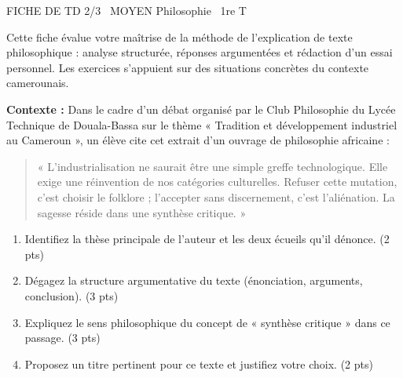 \documentclass[11pt]{article}
\begin{document}
\begin{tcolorbox}[enhanced,colback=popink,colframe=popink,arc=10pt,boxrule=0pt,left=12pt,right=12pt,top=9pt,bottom=9pt]
{\color{white}\popxbold\small FICHE DE TD 2/3 \textbullet\ MOYEN \hfill Philosophie \textbullet\ 1re T\par}
\end{tcolorbox}
\vspace{4pt}
\noindent Cette fiche évalue votre maîtrise de la méthode de l'explication de texte philosophique : analyse structurée, réponses argumentées et rédaction d'un essai personnel. Les exercices s'appuient sur des situations concrètes du contexte camerounais.

\begin{exercice}
\textbf{Contexte :} Dans le cadre d'un débat organisé par le Club Philosophie du Lycée Technique de Douala-Bassa sur le thème « Tradition et développement industriel au Cameroun », un élève cite cet extrait d'un ouvrage de philosophie africaine : 
\begin{quote}
« L'industrialisation ne saurait être une simple greffe technologique. Elle exige une réinvention de nos catégories culturelles. Refuser cette mutation, c'est choisir le folklore ; l'accepter sans discernement, c'est l'aliénation. La sagesse réside dans une synthèse critique. »
\end{quote}
\begin{enumerate}
    \item Identifiez la thèse principale de l'auteur et les deux écueils qu'il dénonce. (2 pts)
    \item Dégagez la structure argumentative du texte (énonciation, arguments, conclusion). (3 pts)
    \item Expliquez le sens philosophique du concept de « synthèse critique » dans ce passage. (3 pts)
    \item Proposez un titre pertinent pour ce texte et justifiez votre choix. (2 pts)
\end{enumerate}
\end{exercice}
\end{document}
